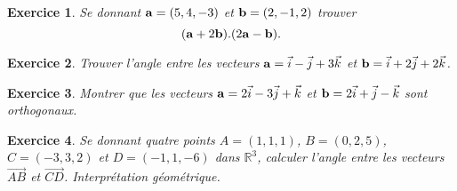 \documentclass[12pt]{article}
\newtheorem{exercice}{\bf Exercice}
\newtheorem{correction}{\bf Correction exercice}
\newenvironment{exo}{
\begin{exercice}\smallskip\normalfont}{\end{exercice}
}
\newenvironment{cor}{
\begin{correction}\smallskip\normalfont}{\end{correction}
}
\newcommand{\I}{{ \vec{i}}}
\newcommand{\J}{{ \vec{j}}}
\newcommand{\K}{{ \vec{k}}}
\newif\ifcorrige\corrigefalse
\begin{document}
\ifcorrige
\color{magenta}
\begin{cor}
  $\qquad$ 
1)  On a $\Vert \I+2\J+4\K \Vert=\sqrt{21}$, donc 
  $${\bf x}=\frac{8}{\sqrt{21}}(\I+2\J+4\K)= \frac{8}{\sqrt{21}}\I+\frac{16}{\sqrt{21}}\J+\frac{32}{\sqrt{21}}\K.$$
  2) De la m\^eme facon, $\Vert -\I+2\J+3\K \Vert=\sqrt{14}$, donc
  $${\bf x}=\frac{5}{\sqrt{14}}(\I-2\J-3\K)= \frac{5}{\sqrt{14}}\I+\frac{-10}{\sqrt{14}}\J+\frac{-15}{\sqrt{14}}\K.$$
\end{cor}
\color{black}
\fi
\begin{exo}
 Se donnant ${\bf a}=(5,4,-3)$ et ${\bf b}=(2,-1,2)$ trouver
 $$({\bf a}+2{\bf b}).(2{\bf a}-{\bf b}). $$
\end{exo}
\ifcorrige
\color{magenta}
\begin{cor}
  $\qquad$ 
  On trouve ${\bf a}+2{\bf b}=(9,2,1)$, $2{\bf a}-{\bf b}=(8,9,-8)$, d'o\`u
  $$({\bf a}+2{\bf b}).(2{\bf a}-{\bf b})=72+18-8=82. $$
\end{cor}
\color{black}
\fi
\begin{exo}
 Trouver l'angle entre les vecteurs ${\bf a}=\I-\J+3\K$ et ${\bf b}=\I+2\J+2\K$.
\end{exo}
\ifcorrige
\color{magenta}
\begin{cor}
  $\qquad$ 
  On calcule ${\bf a}.{\bf b}=5$ puis $\Vert {\bf a} \Vert^2=11$, $\Vert {\bf b} \Vert^2=9$, ainsi
  $$\cos(\theta)=\frac{{\bf a}.{\bf b} }{\Vert {\bf a} \Vert \Vert {\bf b} \Vert}=\frac{5}{3\sqrt{11}},\ \theta=\arccos\left(\frac{5}{3\sqrt{11}} \right).$$
\end{cor}
\color{black}
\fi
\begin{exo}
 Montrer que les vecteurs ${\bf a}=2\I-3\J+\K$ et ${\bf b}=2\I+\J-\K$ sont orthogonaux.
\end{exo}
\ifcorrige
\color{magenta}
\begin{cor}
  $\qquad$ 
  On a ${\bf a}.{\bf b}=4-3-1=0$, ces vecteurs sont donc orthogonaux.
\end{cor}
\color{black}
\fi
\begin{exo} Se donnant quatre points $A=(1,1,1)$, $B=(0,2,5)$, $C=(-3,3,2)$ et $D=(-1,1,-6)$ dans $\mathbb R^3$, calculer l'angle entre les vecteurs
$\overrightarrow{AB} $ et $\overrightarrow{CD}$. Interpr\'etation g\'eom\'etrique.
\end{exo}
 \ifcorrige
\color{magenta}
\begin{cor}
  $\qquad$ 
  On a $\overrightarrow{AB}=(-1,1,4)$ et $\overrightarrow{CD}=(2,-2,-8)$. Puis on obtient
  $\Vert \overrightarrow{AB} \Vert^2=18$ et $\Vert \overrightarrow{CD} \Vert^2=72$. Le produit scalaire
  $$\overrightarrow{AB}.\overrightarrow{CD}=-36. $$
  Si $\theta$ est l'angle entre $\overrightarrow{AB} $ et $\overrightarrow{CD}$, on a
  $$\cos(\theta)=-\frac{36}{\sqrt{18\times 72}} =-1,$$
  donc $\theta=\pi$, et les vecteurs  $\overrightarrow{AB} $ et $\overrightarrow{CD}$ sont donc colinéaires. On déduit de ceci que les quatres points $A,B,C,D$ sont coplanaires (dans un m\^eme plan affine).
\end{cor}
\color{black}
\fi
\end{document}
